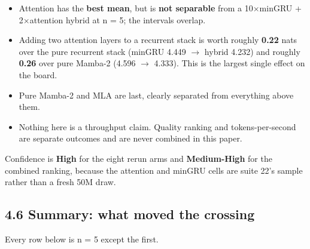 \begin{itemize}
\tightlist
\item
  Attention has the \textbf{best mean}, but is \textbf{not separable} from a 10$\times$minGRU + 2$\times$attention hybrid
  at n = 5; the intervals overlap.
\item
  Adding two attention layers to a recurrent stack is worth roughly \textbf{0.22} nats over the pure
  recurrent stack (minGRU 4.449 $\rightarrow$ hybrid 4.232) and roughly \textbf{0.26} over pure Mamba-2
  (4.596 $\rightarrow$ 4.333). This is the largest single effect on the board.
\item
  Pure Mamba-2 and MLA are last, clearly separated from everything above them.
\item
  Nothing here is a throughput claim. Quality ranking and tokens-per-second are separate outcomes
  and are never combined in this paper.
\end{itemize}

Confidence is \textbf{High} for the eight rerun arms and \textbf{Medium-High} for the combined ranking,
because the attention and minGRU cells are suite 22's sample rather than a fresh 50M draw.

\subsection{4.6 Summary: what moved the crossing}\label{summary-what-moved-the-crossing}

Every row below is n = 5 except the first.

